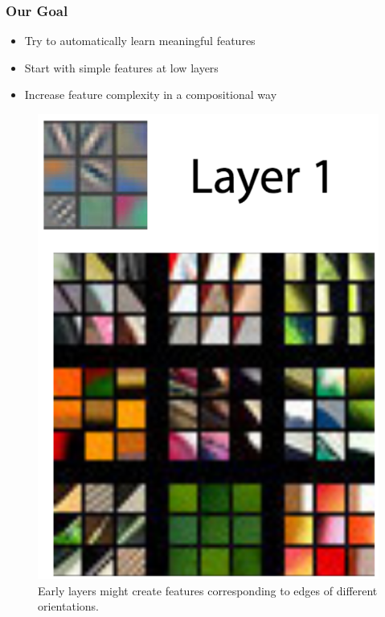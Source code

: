 \documentclass[10pt,mathserif]{beamer}
\begin{document}
\begin{frame}
  \frametitle{Our Goal}
  \begin{itemize}
  \item Try to automatically learn meaningful features
  \item Start with simple features at low layers
  \item Increase feature complexity in a compositional way
  \end{itemize}
  \begin{figure}[ht]
    \centering
    \includegraphics[width=0.3\paperwidth]{figure/zf_layer1}
    \caption{Early layers might create features corresponding to edges of
      different orientations. \label{fig:zf_layer1} }
  \end{figure}
\end{frame}
\end{document}
